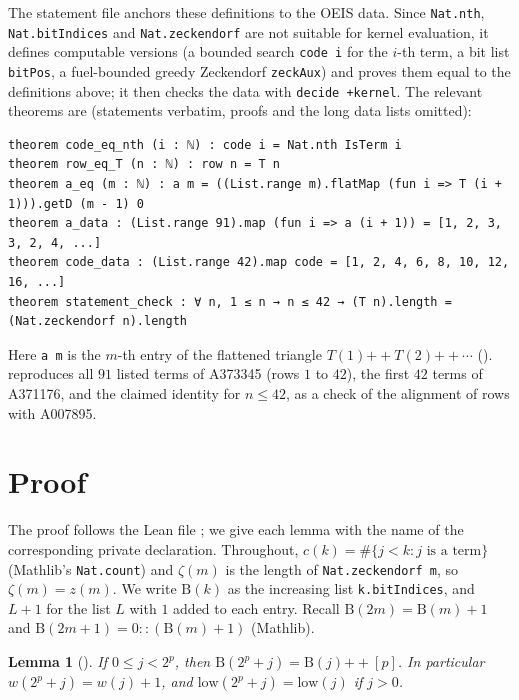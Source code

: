 \documentclass[11pt]{amsart}
\theoremstyle{plain}
\newtheorem{lemma}[theorem]{Lemma}
\theoremstyle{definition}
\newcommand{\Bits}{\mathrm{B}}
\newcommand{\low}{\mathrm{low}}
\begin{document}
The statement file anchors these definitions to the OEIS data. Since \texttt{Nat.nth}, \texttt{Nat.bitIndices} and \texttt{Nat.zeckendorf} are not suitable for kernel evaluation, it defines computable versions (a bounded search \texttt{code i} for the $i$-th term, a bit list \texttt{bitPos}, a fuel-bounded greedy Zeckendorf \texttt{zeckAux}) and proves them equal to the definitions above; it then checks the data with \texttt{decide +kernel}. The relevant theorems are (statements verbatim, proofs and the long data lists omitted):
\begin{lstlisting}
theorem code_eq_nth (i : ℕ) : code i = Nat.nth IsTerm i
theorem row_eq_T (n : ℕ) : row n = T n
theorem a_eq (m : ℕ) : a m = ((List.range m).flatMap (fun i => T (i + 1))).getD (m - 1) 0
theorem a_data : (List.range 91).map (fun i => a (i + 1)) = [1, 2, 3, 3, 2, 4, ...]
theorem code_data : (List.range 42).map code = [1, 2, 4, 6, 8, 10, 12, 16, ...]
theorem statement_check : ∀ n, 1 ≤ n → n ≤ 42 → (T n).length = (Nat.zeckendorf n).length
\end{lstlisting}
Here \texttt{a m} is the $m$-th entry of the flattened triangle $T(1)\mathbin{+\!\!+}T(2)\mathbin{+\!\!+}\cdots$ ().  reproduces all $91$ listed terms of A373345 (rows $1$ to $42$),  the first $42$ terms of A371176, and  the claimed identity for $n\le42$, as a check of the alignment of rows with A007895.

\section{Proof}\label{sec:proof}

The proof follows the Lean file ; we give each lemma with the name of the corresponding private declaration. Throughout, $c(k)=\#\{j<k: j\text{ is a term}\}$ (Mathlib's \texttt{Nat.count}) and $\zeta(m)$ is the length of \texttt{Nat.zeckendorf m}, so $\zeta(m)=z(m)$. We write $\Bits(k)$ as the increasing list \texttt{k.bitIndices}, and $L+1$ for the list $L$ with $1$ added to each entry. Recall $\Bits(2m)=\Bits(m)+1$ and $\Bits(2m+1)=0::(\Bits(m)+1)$ (Mathlib).

\begin{lemma}[]\label{lem:bits}
If $0\le j<2^p$, then $\Bits(2^p+j)=\Bits(j)\mathbin{+\!\!+}[p]$. In particular $w(2^p+j)=w(j)+1$, and $\low(2^p+j)=\low(j)$ if $j>0$.
\end{lemma}
\end{document}
